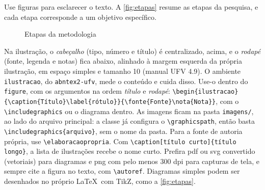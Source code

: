 Use figuras para esclarecer o texto. A \autoref{fig:etapas} resume as etapas da
pesquisa, e cada etapa corresponde a um objetivo específico.

\begin{figure}[htbp]
  \begin{ilustracao}{\caption{Etapas da metodologia}\label{fig:etapas}}{\elaboracaopropria}
  \end{ilustracao}
\end{figure}

\begin{dica}
Na ilustração, o \emph{cabeçalho} (tipo, número e título) é centralizado, acima, e o
\emph{rodapé} (fonte, legenda e notas) fica abaixo, alinhado à margem esquerda da
própria ilustração, em espaço simples e tamanho 10 (manual UFV 4.9). O ambiente
\texttt{ilustracao}, do \texttt{abntex2-ufv}, mede o conteúdo e cuida disso. Use-o dentro
do \texttt{figure}, com os argumentos na ordem \emph{título} e \emph{rodapé}:
\texttt{\textbackslash begin\{ilustracao\}\allowbreak\{\textbackslash caption\{Título\}\allowbreak\textbackslash label\{rótulo\}\}\allowbreak\{\textbackslash fonte\{Fonte\}\allowbreak\textbackslash nota\{Nota\}\}},
com o \texttt{\textbackslash includegraphics} ou o diagrama dentro. As imagens ficam na
pasta \texttt{imagens/}, ao lado do arquivo principal: a classe já configura o
\texttt{\textbackslash graphicspath}, então basta
\texttt{\textbackslash includegraphics\{arquivo\}}, sem o nome da pasta. Para a fonte de autoria
própria, use \texttt{\textbackslash elaboracaopropria}. Com
\texttt{\textbackslash caption[título curto]\{título longo\}}, a lista de ilustrações
recebe o nome curto. Prefira \ac{pdf} ou \ac{svg} convertido (vetoriais) para diagramas e
\ac{png} com pelo menos 300 dpi para capturas de tela, e sempre cite a figura no texto,
com \texttt{\textbackslash autoref}. Diagramas simples podem ser desenhados no próprio
\LaTeX\ com TikZ, como a \autoref{fig:etapas}.
\end{dica}

